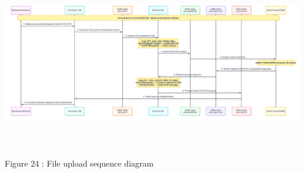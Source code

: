 \documentclass[12pt,a4paper]{report}
\begin{document}
\includegraphics[width=7.54861in,height=2.97986in]{vertopal_d1b0b2209edd4c6aa8254f57daa0953b/media/image43.png}

\protect\hypertarget{_Toc201954500}{}{}Figure 24 : File upload sequence
diagram
\end{document}
